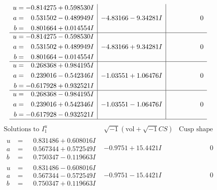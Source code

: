 \documentclass[1p]{elsarticle_modified}
\theoremstyle{definition}
\newcommand{\I}{\sqrt{-1}}
\begin{document}
$$\begin{array}{c|c|c}
\begin{aligned}
u &= -0.814275 + 0.598530 I \\
a &= \phantom{-}0.531502 - 0.489949 I \\
b &= \phantom{-}0.801664 + 0.014554 I\end{aligned}
 & -4.83166 - 9.34281 I & \phantom{-0.000000 } 0 \\ \hline\begin{aligned}
u &= -0.814275 - 0.598530 I \\
a &= \phantom{-}0.531502 + 0.489949 I \\
b &= \phantom{-}0.801664 - 0.014554 I\end{aligned}
 & -4.83166 + 9.34281 I & \phantom{-0.000000 } 0 \\ \hline\begin{aligned}
u &= \phantom{-}0.268368 + 0.984195 I \\
a &= \phantom{-}0.239016 - 0.542346 I \\
b &= -0.617928 + 0.932521 I\end{aligned}
 & -1.03551 + 1.06476 I & \phantom{-0.000000 } 0 \\ \hline\begin{aligned}
u &= \phantom{-}0.268368 - 0.984195 I \\
a &= \phantom{-}0.239016 + 0.542346 I \\
b &= -0.617928 - 0.932521 I\end{aligned}
 & -1.03551 - 1.06476 I & \phantom{-0.000000 } 0\\
 \hline 
 \end{array}$$\newpage$$\begin{array}{c|c|c}  
\text{Solutions to }I^u_{1}& \I (\text{vol} + \sqrt{-1}CS) & \text{Cusp shape}\\
 \hline 
\begin{aligned}
u &= \phantom{-}0.831486 + 0.608016 I \\
a &= \phantom{-}0.567344 + 0.572549 I \\
b &= \phantom{-}0.750347 - 0.119663 I\end{aligned}
 & -0.9751 + 15.4421 I & \phantom{-0.000000 } 0 \\ \hline\begin{aligned}
u &= \phantom{-}0.831486 - 0.608016 I \\
a &= \phantom{-}0.567344 - 0.572549 I \\
b &= \phantom{-}0.750347 + 0.119663 I\end{aligned}
 & -0.9751 - 15.4421 I & \phantom{-0.000000 } 0 \\ \hline\begin{aligned}

\end{aligned}
\end{array}$$
\end{document}
